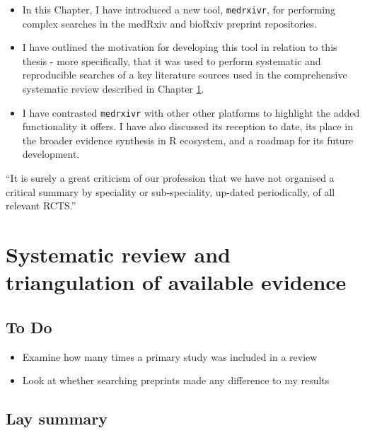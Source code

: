 \documentclass[a4paper, twoside]{templates/ociamthesis}
\providecommand{\tightlist}{%
  \setlength{\itemsep}{0pt}\setlength{\parskip}{0pt}}
\begin{document}
\begin{itemize}
\item
  In this Chapter, I have introduced a new tool, \texttt{medrxivr}, for performing complex searches in the medRxiv and bioRxiv preprint repositories.
\item
  I have outlined the motivation for developing this tool in relation to this thesis - more specifically, that it was used to perform systematic and reproducible searches of a key literature sources used in the comprehensive systematic review described in Chapter \ref{sys-rev-heading}.
\item
  I have contrasted \texttt{medrxivr} with other other platforms to highlight the added functionality it offers. I have also discussed its reception to date, its place in the broader evidence synthesis in R ecosystem, and a roadmap for its future development.
\end{itemize}

\begin{savequote}
``It is surely a great criticism of our profession that we have not
organised a critical summary by speciality or sub-speciality, up-dated
periodically, of all relevant RCTS.''
\end{savequote}



\hypertarget{sys-rev-heading}{%
\chapter{Systematic review and triangulation of available evidence}\label{sys-rev-heading}}

\minitoc 

\hypertarget{to-do}{%
\section{To Do}\label{to-do}}

\begin{itemize}
\tightlist
\item
  Examine how many times a primary study was included in a review\\
\item
  Look at whether searching preprints made any difference to my results
\end{itemize}

\hypertarget{lay-summary-1}{%
\section{Lay summary}\label{lay-summary-1}}
\end{document}
